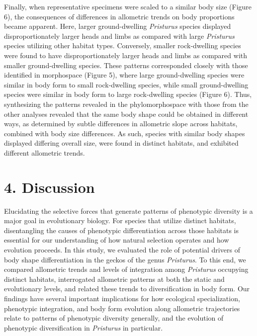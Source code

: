 \documentclass[
  11pt,
]{article}
\begin{document}
Finally, when representative specimens were scaled to a similar body
size (Figure 6), the consequences of differences in allometric trends on
body proportions became apparent. Here, larger ground-dwelling
\emph{Pristurus} species displayed disproportionately larger heads and
limbs as compared with large \emph{Pristurus} species utilizing other
habitat types. Conversely, smaller rock-dwelling species were found to
have disproportionately larger heads and limbs as compared with smaller
ground-dwelling species. These patterns corresponded closely with those
identified in morphospace (Figure 5), where large ground-dwelling
species were similar in body form to small rock-dwelling species, while
small ground-dwelling species were similar in body form to large
rock-dwelling species (Figure 6). Thus, synthesizing the patterns
revealed in the phylomorphospace with those from the other analyses
revealed that the same body shape could be obtained in different ways,
as determined by subtle differences in allometric slope across habitats,
combined with body size differences. As such, species with similar body
shapes displayed differing overall size, were found in distinct
habitats, and exhibited different allometric trends. \hfill\break

\hypertarget{discussion}{%
\section{4. Discussion}\label{discussion}}

Elucidating the selective forces that generate patterns of phenotypic
diversity is a major goal in evolutionary biology. For species that
utilize distinct habitats, disentangling the causes of phenotypic
differentiation across those habitats is essential for our understanding
of how natural selection operates and how evolution proceeds. In this
study, we evaluated the role of potential drivers of body shape
differentiation in the geckos of the genus \emph{Pristurus}. To this
end, we compared allometric trends and levels of integration among
\emph{Pristurus} occupying distinct habitats, interrogated allometric
patterns at both the static and evolutionary levels, and related these
trends to diversification in body form. Our findings have several
important implications for how ecological specialization, phenotypic
integration, and body form evolution along allometric trajectories
relate to patterns of phenotypic diversity generally, and the evolution
of phenotypic diversification in \emph{Pristurus} in particular.
\hfill\break
\end{document}
